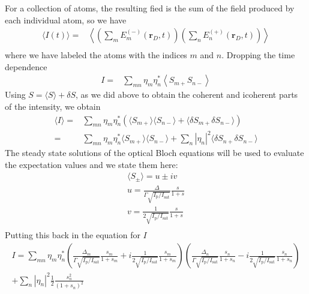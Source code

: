 \documentclass[11pt,letter]{article}
\newcommand{\bv}[1]{\ensuremath{\bm{#1}}}
\begin{document}
For a collection of atoms, the resulting fied is the sum of the field produced by each individual atom, so we have  
\begin{equation}
\begin{split}
\langle I (t) \rangle = & 
    \left\langle \left( \sum_{m} E_{m}^{(-)}(\bv{r}_{D}, t) \right)
            \left( \sum_{n} E_{n}^{(+)}(\bv{r}_{D}, t) \right) \right\rangle \\
\end{split} 
\end{equation}
where we have labeled the atoms with the indices $m$ and $n$.  Dropping the time dependence
\begin{equation}
\begin{split}
 I = &
    \sum_{mn}  \eta_{m}\eta_{n}^{*}  
              \left\langle S_{m+}S_{n-} \right\rangle
\end{split} 
\end{equation}
Using $S=\langle S \rangle + \delta S$, as we did above to obtain the coherent and icoherent parts of the intensity, we obtain
\begin{equation}
\begin{split}
\langle I \rangle = &
    \sum_{mn}  \eta_{m}\eta_{n}^{*} \left(
              \langle S_{m+}\rangle \langle S_{n-} \rangle  
            + \langle \delta S_{m+} \delta S_{n-} \rangle \right) \\
    = & 
    \sum_{mn}  \eta_{m}\eta_{n}^{*} 
        \langle  S_{m+}\rangle \langle S_{n-} \rangle 
   + \sum_{n} | \eta_{n}|^{2} \langle \delta S_{n+} \delta S_{n-} \rangle  
\end{split} 
\end{equation}
The steady state solutions of the optical Bloch equations will be used to evaluate the expectation values and we state them here:
\begin{gather} 
    \langle S_{\pm} \rangle =  u \pm i v  \\
    u =  \frac{ \Delta }{ \Gamma  \sqrt{ I_{\mathrm{p}} / I_{\mathrm{sat}}} } \frac{s}{ 1 + s } \\
    v =  \frac{ 1 } { 2 \sqrt{ I_{\mathrm{p}} / I_{\mathrm{sat}}} } \frac{s}{1+s} \\
\end{gather}
Putting this back in the equation for $I$  
\begin{multline}
 I = 
  \sum_{mn}  \eta_{m}\eta_{n}^{*}
    \left(
    \frac{ \Delta_{m} }{ \Gamma  \sqrt{ I_{\mathrm{p}} / I_{\mathrm{sat}}} } 
    \frac{s_{m}}{ 1 + s_{m} } 
   + i 
    \frac{ 1 } { 2 \sqrt{ I_{\mathrm{p}} / I_{\mathrm{sat}}} } \frac{s_{m}}{1+s_{m}} 
    \right) 
    \left(
    \frac{ \Delta_{n} }{ \Gamma  \sqrt{ I_{\mathrm{p}} / I_{\mathrm{sat}}} } 
    \frac{s_{n}}{ 1 + s_{n} } 
   - i 
    \frac{ 1 } { 2 \sqrt{ I_{\mathrm{p}} / I_{\mathrm{sat}}} } \frac{s_{n}}{1+s_{n}} 
    \right) \\
   + \sum_{n} | \eta_{n}|^{2} \frac{1}{2} \frac{ s_{n}^{2} } { (1 + s _{n} )^{2} } 
\end{multline}
\end{document}
